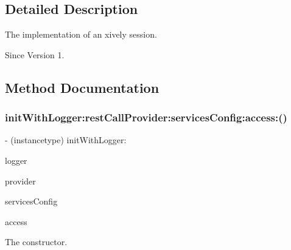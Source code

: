 \subsection{Detailed Description}
The implementation of an xively session. 

\begin{DoxySince}{Since}
Version 1. 
\end{DoxySince}


\subsection{Method Documentation}
\hypertarget{interface_x_i_session_internal_aecd47a945b3c947b44952fceb6272386}{}\label{interface_x_i_session_internal_aecd47a945b3c947b44952fceb6272386} 
\subsubsection{\texorpdfstring{init\+With\+Logger\+:rest\+Call\+Provider\+:services\+Config\+:access\+:()}{initWithLogger:restCallProvider:servicesConfig:access:()}}
{\footnotesize\ttfamily -\/ (instancetype) init\+With\+Logger\+: \begin{DoxyParamCaption}\item[{(id$<$\hyperlink{protocol_x_i_c_o_logging-p}{X\+I\+C\+O\+Logging}$>$)}]{logger }\item[{restCallProvider:(id$<$X\+I\+R\+E\+S\+T\+Call\+Provider$>$)}]{provider }\item[{servicesConfig:(\hyperlink{interface_x_i_services_config}{X\+I\+Services\+Config} $\ast$)}]{services\+Config }\item[{access:(\hyperlink{class_x_i_access}{X\+I\+Access} $\ast$)}]{access }\end{DoxyParamCaption}}



The constructor. 


